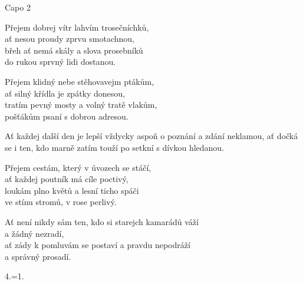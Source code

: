 \re{} Capo 2


\ve
Přejem dobrej vítr lahvím trosečníchků,\\
ať nesou proudy zprvu smotachnou,\\
břeh ať nemá skály a slova prosebníků\\
do rukou sprvný lidi dostanou.

\ve
Přejem klidný nebe stěhovavejm ptákům,\\
ať silný křídla je zpátky donesou,\\
tratím pevný mosty a volný tratě vlakům,\\
pošťákům psaní s dobrou adresou.

\cho{}
Ať každej další den je lepší vždycky aspoň o poznání
a zdání neklamou,
ať dočká se i ten, kdo marně zatím touží po setkní
s dívkou hledanou.

\ve
Přejem cestám, který v úvozech se stáčí,\\
ať každej poutník má cíle poctivý,\\
loukám plno květů a lesní ticho spáči\\
ve stínu stromů, v rose perlivý.

\cho{}
Ať není nikdy sám ten, kdo si starejch kamarádů váží\\
a žádný nezradí,\\
ať zády k pomluvám se postaví a pravdu nepodráží\\
a správný prosadí.

\re{}4.=1.

\esong